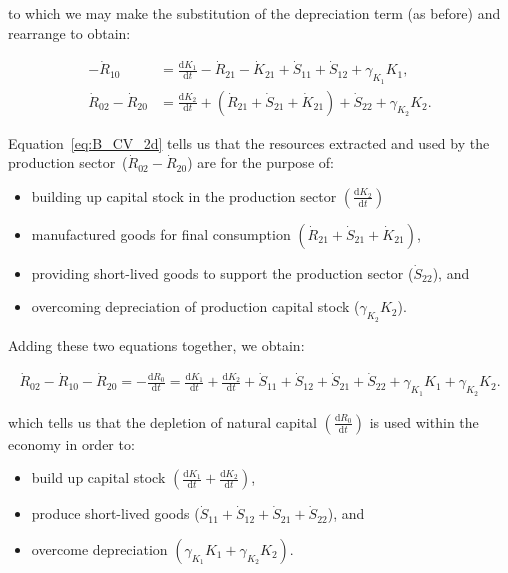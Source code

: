 \noindent{}to which we may make the 
substitution of the depreciation term (as before)
and rearrange to obtain:

\begin{align} 
\label{eq:B_CV_1d}
	- \dot{R}_{10} 	 										&
	 = \frac{\mathrm{d}K_{1}}{\mathrm{d}t}
	-  \dot{R}_{21}
	- \dot{K}_{21}
	+ \dot{S}_{11}
	+ \dot{S}_{12} 
	+ \gamma_{K_{1}}K_{1},											\\
\label{eq:B_CV_2d}
	\dot{R}_{02}
	- \dot{R}_{20} 											&
	= \frac{\mathrm{d}K_{2}}{\mathrm{d}t}	
	+ \left(\dot{R}_{21}
	+ \dot{S}_{21}
	+ \dot{K}_{21}\right)	 
	+ \dot{S}_{22}
	+ \gamma_{K_{2}}K_{2}.
\end{align}

Equation~\ref{eq:B_CV_2d} tells us that the resources
extracted and used by 
the production sector~($\dot{R}_{02} - \dot{R}_{20}$)
are for the purpose of:

\begin{itemize}
	\item building up capital stock
	in the production sector
	$\left(\frac{\mathrm{d}K_{2}}{\mathrm{d}t}\right)$
	\item manufactured goods 
	for final consumption
	$\left(\dot{R}_{21}
	+ \dot{S}_{21}
	+ \dot{K}_{21}\right)	$,
	\item providing short-lived goods
	to support the 
	production sector ($\dot{S}_{22}$), and
	\item overcoming depreciation of production 
	capital stock ($\gamma_{K_{2}}K_{2}$).
\end{itemize}

Adding these two equations together,
we obtain:

\begin{align} 
\label{eq:B_CV_1and2}
	\dot{R}_{02}
	- \dot{R}_{10}
	- \dot{R}_{20}
	= - \frac{\mathrm{d}R_{0}}{\mathrm{d}t}
	= \frac{\mathrm{d}K_{1}}{\mathrm{d}t}
	+ \frac{\mathrm{d}K_{2}}{\mathrm{d}t}
	+ \dot{S}_{11}
	+ \dot{S}_{12} 
	+ \dot{S}_{21}
	+ \dot{S}_{22}
	+ \gamma_{K_{1}}K_{1}
	+ \gamma_{K_{2}}K_{2}.
\end{align}

\noindent{}which tells us that
the depletion of natural capital
$\left(\frac{\mathrm{d}R_{0}}{\mathrm{d}t}\right)$
is used within the economy in order to:

\begin{itemize}
	\item build up capital stock
	$\left(\frac{\mathrm{d}K_{1}}{\mathrm{d}t}
	+ \frac{\mathrm{d}K_{2}}{\mathrm{d}t}\right)$,
	\item produce short-lived goods
	($\dot{S}_{11}
	+ \dot{S}_{12} 
	+ \dot{S}_{21}
	+ \dot{S}_{22}$), and
	\item overcome depreciation
	$\left(\gamma_{K_{1}}K_{1}
	+ \gamma_{K_{2}}K_{2}\right)$.
\end{itemize}



